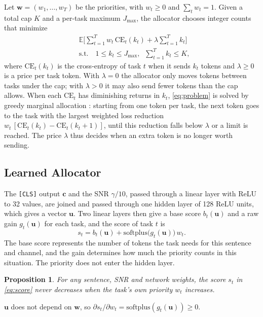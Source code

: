 \documentclass[conference]{IEEEtran}
\newtheorem{proposition}{Proposition}
\begin{document}
Let $\mathbf{w} = (w_1, \ldots, w_T)$ be the priorities, with
$w_t \geq 0$ and $\sum_t w_t = 1$. Given a total cap $K$ and a
per-task maximum $J_{\max}$, the allocator chooses integer counts that
minimize
\begin{equation}
  \begin{aligned}
    & \mathbb{E}\Big[\sum_{t=1}^{T} w_t\, \mathrm{CE}_t(k_t)
                   + \lambda \sum_{t=1}^{T} k_t\Big] \\
    & \text{s.t.} \quad 1 \leq k_t \leq J_{\max}, \;\; \sum_{t=1}^{T} k_t \leq K,
  \end{aligned}
  \label{eq:problem}
\end{equation}
where $\mathrm{CE}_t(k_t)$ is the cross-entropy of task $t$ when it
sends $k_t$ tokens and $\lambda \geq 0$ is a price per task token.
With $\lambda{=}0$ the allocator only moves tokens between tasks under
the cap; with $\lambda{>}0$ it may also send fewer tokens than the cap
allows. When each $\mathrm{CE}_t$ has diminishing returns in $k_t$,
\eqref{eq:problem} is solved by greedy marginal allocation
\cite{fox1966marginal}: starting from one token per task, the next
token goes to the task with the largest weighted loss reduction
$w_t\,[\mathrm{CE}_t(k_t) - \mathrm{CE}_t(k_t{+}1)]$, until this
reduction falls below $\lambda$ or a limit is reached. The price
$\lambda$ thus decides when an extra token is no longer worth
sending.

\subsection{Learned Allocator}
\label{ssec:allocator}

The \texttt{[CLS]} output $\mathbf{c}$ and the SNR $\gamma/10$, passed
through a linear layer with ReLU to 32 values, are joined and passed
through one hidden layer of 128 ReLU units, which gives a vector
$\mathbf{u}$. Two linear layers then give a base score
$b_t(\mathbf{u})$ and a raw gain $g_t(\mathbf{u})$ for each task, and
the score of task $t$ is
\begin{equation}
  s_t = b_t(\mathbf{u}) + \mathrm{softplus}\big(g_t(\mathbf{u})\big)\, w_t .
  \label{eq:score}
\end{equation}
The base score represents the number of tokens the task needs for
this sentence and channel, and the gain determines how much the
priority counts in this situation. The priority does not enter the hidden layer.

\begin{proposition}
\label{prop:monotone}
For any sentence, SNR and network weights, the score $s_t$ in
\eqref{eq:score} never decreases when the task's own priority $w_t$
increases.
\end{proposition}
\begin{IEEEproof}
$\mathbf{u}$ does not depend on $\mathbf{w}$, so
$\partial s_t / \partial w_t = \mathrm{softplus}(g_t(\mathbf{u})) \geq 0$.
\end{IEEEproof}
\end{document}
